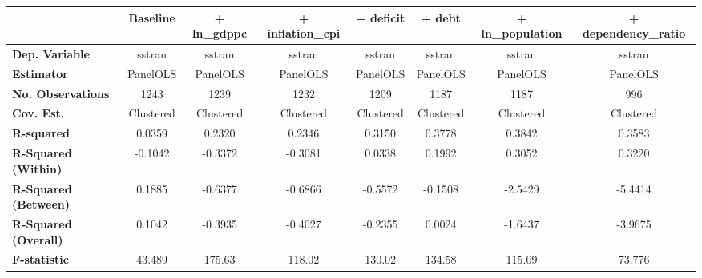\begin{center}
\begin{tabular}{lccccccc}
\toprule
                                   & \textbf{Baseline} & \textbf{+ ln\_gdppc} & \textbf{+ inflation\_cpi} & \textbf{+ deficit} & \textbf{+ debt} & \textbf{+ ln\_population} & \textbf{+ dependency\_ratio}  \\
\midrule
\textbf{Dep. Variable}             &       sstran      &        sstran        &           sstran          &       sstran       &      sstran     &           sstran          &            sstran             \\
\textbf{Estimator}                 &      PanelOLS     &       PanelOLS       &          PanelOLS         &      PanelOLS      &     PanelOLS    &          PanelOLS         &           PanelOLS            \\
\textbf{No. Observations}          &        1243       &         1239         &            1232           &        1209        &       1187      &            1187           &             996               \\
\textbf{Cov. Est.}                 &     Clustered     &      Clustered       &         Clustered         &     Clustered      &    Clustered    &         Clustered         &          Clustered            \\
\textbf{R-squared}                 &       0.0359      &        0.2320        &           0.2346          &       0.3150       &      0.3778     &           0.3842          &            0.3583             \\
\textbf{R-Squared (Within)}        &      -0.1042      &       -0.3372        &          -0.3081          &       0.0338       &      0.1992     &           0.3052          &            0.3220             \\
\textbf{R-Squared (Between)}       &       0.1885      &       -0.6377        &          -0.6866          &      -0.5572       &     -0.1508     &          -2.5429          &           -5.4414             \\
\textbf{R-Squared (Overall)}       &       0.1042      &       -0.3935        &          -0.4027          &      -0.2355       &      0.0024     &          -1.6437          &           -3.9675             \\
\textbf{F-statistic}               &       43.489      &        175.63        &           118.02          &       130.02       &      134.58     &           115.09          &            73.776             \\

\end{tabular}
\end{center}
